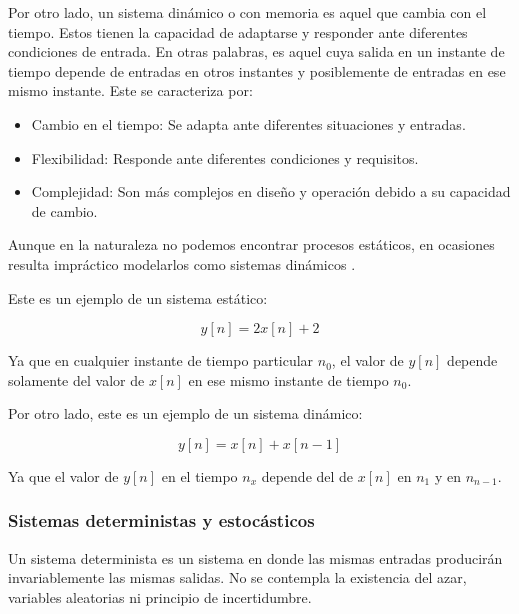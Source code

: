 Por otro lado, un sistema dinámico o con memoria es aquel que cambia con el tiempo. Estos tienen la capacidad de adaptarse y responder ante diferentes condiciones de entrada. En otras palabras, es aquel cuya salida en un instante de tiempo depende de entradas en otros instantes y posiblemente de entradas en ese mismo instante. Este se caracteriza por:

\begin{itemize}
	
	\item Cambio en el tiempo: Se adapta ante diferentes situaciones y entradas.
	
	\item Flexibilidad: Responde ante diferentes condiciones y requisitos.
	
	\item Complejidad: Son más complejos en diseño y operación debido a su capacidad de cambio.
	
\end{itemize}

Aunque en la naturaleza no podemos encontrar procesos estáticos, en ocasiones resulta impráctico modelarlos como sistemas dinámicos \cite{dinamicos}.

Este es un ejemplo de un sistema estático:

\begin{equation*}
	y[n] = 2x[n] + 2
\end{equation*}

Ya que en cualquier instante de tiempo particular $n_0$, el valor de $y[n]$ depende solamente del valor de $x[n]$ en ese mismo instante de tiempo $n_0$.

Por otro lado, este es un ejemplo de un sistema dinámico:

\begin{equation*}
	y[n] = x[n] + x[n-1]
\end{equation*}

Ya que el valor de $y[n]$ en el tiempo $n_x$ depende del de $x[n]$ en $n_1$ y en $n_{n-1}$.

\subsubsection{Sistemas deterministas y estocásticos}

Un sistema determinista es un sistema en donde las mismas entradas producirán invariablemente las mismas salidas. No se contempla la existencia del azar, variables aleatorias ni principio de incertidumbre.

